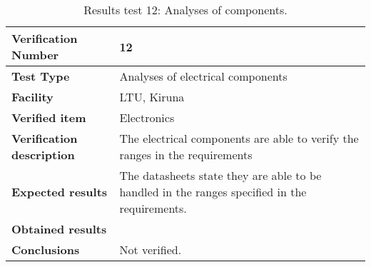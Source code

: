 \begin{table}[H]
\centering

\begin{tabular}{|m{}| m{} |}
\hline
\textbf{Verification Number} 		& 12 					\\ \hline
\textbf{Test Type} 					& Analyses of electrical components		\\ \hline
\textbf{Facility} 					& LTU, Kiruna \\ \hline
\textbf{Verified item} 				& Electronics \\ \hline

\textbf{Verification description} 	& The electrical components are able to verify the ranges in the requirements \\ \hline

\textbf{Expected results} 			& The datasheets state they are able to be handled in the ranges specified in the requirements. \\ \hline

\textbf{Obtained results} 			& \\ \hline

\textbf{Conclusions} 				& Not verified.		\\ \hline
\end{tabular}
\caption{Results test 12: Analyses of components.}
\label{tab:testresult12:components}
\end{table}


\raggedbottom
